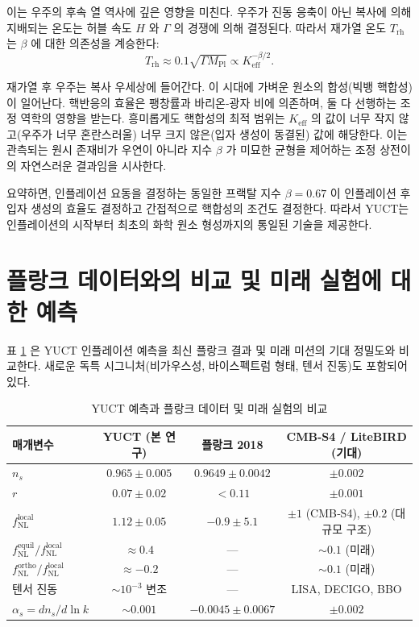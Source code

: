 \documentclass[11pt,a4paper]{article}
\theoremstyle{remark}
\newcommand{\Keff}{K_{\mathrm{eff}}}
\newcommand{\rs}{r}
\begin{document}
	이는 우주의 후속 열 역사에 깊은 영향을 미친다. 우주가 진동 응축이 아닌 복사에 의해 지배되는 온도는 허블 속도 $H$ 와 $\Gamma$ 의 경쟁에 의해 결정된다. 따라서 재가열 온도 $T_{\mathrm{rh}}$ 는 $\beta$ 에 대한 의존성을 계승한다:
	\begin{equation}
		T_{\mathrm{rh}} \approx 0.1 \sqrt{\Gamma M_{\mathrm{Pl}}} \propto \Keff^{-\beta/2}.
		\label{eq:trh}
	\end{equation}
	
	재가열 후 우주는 복사 우세상에 들어간다. 이 시대에 가벼운 원소의 합성(빅뱅 핵합성)이 일어난다. 핵반응의 효율은 팽창률과 바리온-광자 비에 의존하며, 둘 다 선행하는 조정 역학의 영향을 받는다. 흥미롭게도 핵합성의 최적 범위는 $\Keff$ 의 값이 너무 작지 않고(우주가 너무 혼란스러울) 너무 크지 않은(입자 생성이 동결된) 값에 해당한다. 이는 관측되는 원시 존재비가 우연이 아니라 지수 $\beta$ 가 미묘한 균형을 제어하는 조정 상전이의 자연스러운 결과임을 시사한다.
	
	요약하면, 인플레이션 요동을 결정하는 동일한 프랙탈 지수 $\beta = 0.67$ 이 인플레이션 후 입자 생성의 효율도 결정하고 간접적으로 핵합성의 조건도 결정한다. 따라서 YUCT는 인플레이션의 시작부터 최초의 화학 원소 형성까지의 통일된 기술을 제공한다.
	
	\section{플랑크 데이터와의 비교 및 미래 실험에 대한 예측}
	\label{sec:comparison}
	
	표 \ref{tab:comparison} 은 YUCT 인플레이션 예측을 최신 플랑크 결과 및 미래 미션의 기대 정밀도와 비교한다. 새로운 독특 시그니처(비가우스성, 바이스펙트럼 형태, 텐서 진동)도 포함되어 있다.
	
	\begin{table}[htbp]
		\centering
		\caption{YUCT 예측과 플랑크 데이터 및 미래 실험의 비교}
		\label{tab:comparison}
		\begin{tabular}{lccc}
			\toprule
			\textbf{매개변수} & \textbf{YUCT (본 연구)} & \textbf{플랑크 2018} & \textbf{CMB‑S4 / LiteBIRD (기대)} \\
			\midrule
			$n_s$ & $0.965 \pm 0.005$ & $0.9649 \pm 0.0042$ & $\pm 0.002$ \\
			$\rs$ & $0.07 \pm 0.02$ & $<0.11$ & $\pm 0.001$ \\
			$f_{\mathrm{NL}}^{\mathrm{local}}$ & $1.12 \pm 0.05$ & $-0.9 \pm 5.1$ & $\pm 1$ (CMB‑S4), $\pm 0.2$ (대규모 구조) \\
			$f_{\mathrm{NL}}^{\mathrm{equil}} / f_{\mathrm{NL}}^{\mathrm{local}}$ & $\approx 0.4$ & — & $\sim 0.1$ (미래) \\
			$f_{\mathrm{NL}}^{\mathrm{ortho}} / f_{\mathrm{NL}}^{\mathrm{local}}$ & $\approx -0.2$ & — & $\sim 0.1$ (미래) \\
			텐서 진동 & $\sim 10^{-3}$ 변조 & — & LISA, DECIGO, BBO \\
			$\alpha_s = dn_s/d\ln k$ & $\sim 0.001$ & $-0.0045 \pm 0.0067$ & $\pm 0.002$ \\
			\bottomrule
		\end{tabular}
	\end{table}
	
\end{document}

